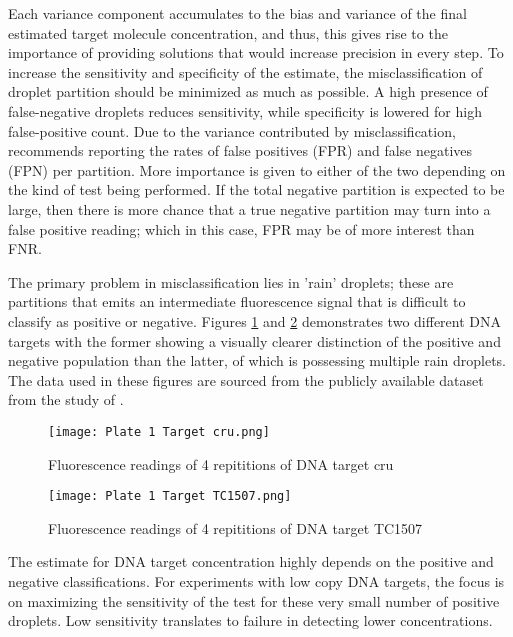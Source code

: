 Each variance component accumulates to the bias and variance of the final estimated target molecule concentration, and thus, this gives rise to the importance of providing solutions that would increase precision in every step. To increase the sensitivity and specificity of the estimate, the misclassification of droplet partition should be minimized as much as possible. A high presence of false-negative droplets reduces sensitivity, while specificity is lowered for high false-positive count. Due to the variance contributed by misclassification,  recommends reporting the rates of false positives (FPR) and false negatives (FPN) per partition. More importance is given to either of the two depending on the kind of test being performed. If the total negative partition is expected to be large, then there is more chance that a true negative partition may turn into a false positive reading; which in this case, FPR may be of more interest than FNR. 

The primary problem in misclassification lies in 'rain' droplets; these are partitions that emits an intermediate fluorescence signal that is difficult to classify as positive or negative. Figures \ref{fig:plate1cru} and \ref{fig:plate1tc1507} demonstrates two different DNA targets with the former showing a visually clearer distinction of the positive and negative population than the latter, of which is possessing multiple rain droplets. The data used in these figures are sourced from the publicly available dataset from the study of . 

\begin{figure}[h]
    \centering
    \texttt{[image: Plate 1 Target cru.png]}
    \caption{Fluorescence readings of 4 repititions of DNA target cru}
        \label{fig:plate1cru}
\end{figure}

\begin{figure}[h]
    \centering
    \texttt{[image: Plate 1 Target TC1507.png]}
    \caption{Fluorescence readings of 4 repititions of DNA target TC1507}
        \label{fig:plate1tc1507}
\end{figure}

The estimate for DNA target concentration highly depends on the positive and negative classifications. For experiments with low copy DNA targets, the focus is on maximizing the sensitivity of the test for these very small number of positive droplets. Low sensitivity translates to failure in detecting lower concentrations. 

